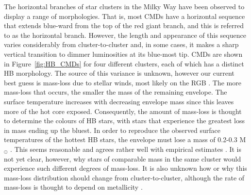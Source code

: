 The horizontal branches of star clusters in the Milky Way have been
observed to display a range of morphologies.  That is, most CMDs have
a horizontal sequence that extends blue-ward from the top of the red
giant branch, and this is referred to as the horizontal branch.
However, the length and appearance of this sequence varies
considerably from cluster-to-cluster and, in some cases, it makes a
sharp vertical transition to dimmer luminosities at its blue-most 
tip.  %
CMDs are shown in Figure~\ref{fig:HB_CMDs} for four
different clusters, each of which has a distinct HB morphology.  The
source of this 
variance is unknown, however our current best guess is mass-loss due
to stellar winds, most likely on the RGB \citep[e.g.][]{iben74, dotter10}.
The more mass-loss that occurs, the 
smaller the mass of the remaining envelope.  The surface temperature
increases with decreasing envelope mass since this leaves more of the
hot core exposed.  Consequently, the amount of mass-loss is thought to
determine the colours of HB stars, with stars that experience the
greatest loss in mass ending up the bluest.  In order to reproduce the
observed surface temperatures of the hottest HB stars, the envelope
must lose a mass of 0.2-0.3 M$_{\odot}$ \citep{eggleton06}.  This
seems reasonable and agrees rather well with empirical estimates
\citep[e.g.][]{judge91}.  It is
not yet clear, however, why stars of comparable mass in the same
cluster would experience such different degrees of mass-loss.  It is
also unknown how or why this mass-loss distribution should change from
cluster-to-cluster, although the rate of mass-loss is thought to 
depend on metallicity \citep[e.g.][]{reimers75}.

